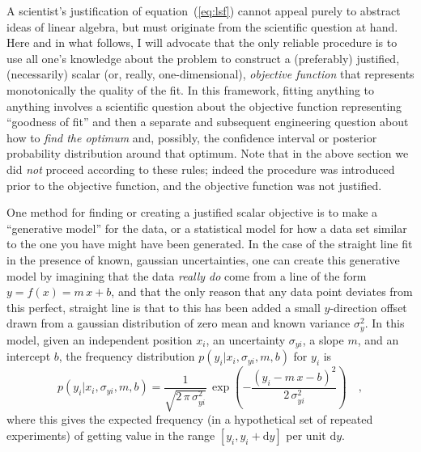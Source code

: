 \documentclass[12pt]{article}
\renewcommand{\d}{\mathrm{d}}
\begin{document}
A scientist's justification of equation~(\ref{eq:lsf}) cannot appeal
purely to abstract ideas of linear algebra, but must originate from
the scientific question at hand.  Here and in what follows, I will
advocate that the only reliable procedure is to use all one's
knowledge about the problem to construct a (preferably) justified,
(necessarily) scalar (or, really, one-dimensional), \emph{objective
function} that represents monotonically the quality of the fit.  In
this framework, fitting anything to anything involves a scientific
question about the objective function representing ``goodness of fit''
and then a separate and subsequent engineering question about how to
\emph{find the optimum} and, possibly, the confidence interval or
posterior probability distribution around that optimum.  Note that in
the above section we did \emph{not} proceed according to these rules;
indeed the procedure was introduced prior to the objective function,
and the objective function was not justified.

One method for finding or creating a justified scalar objective is to
make a ``generative model'' for the data, or a statistical model for
how a data set similar to the one you have might have been generated.
In the case of the straight line fit in the presence of known,
gaussian uncertainties, one can create this generative model by
imagining that the data \emph{really do} come from a line of the form
$y = f(x) = m\,x+b$, and that the only reason that any data point
deviates from this perfect, straight line is that to this has been
added a small $y$-direction offset drawn from a gaussian distribution
of zero mean and known variance $\sigma_y^2$.  In this model, given an
independent position $x_i$, an uncertainty $\sigma_{yi}$, a slope $m$,
and an intercept $b$, the frequency distribution
$p(y_i|x_i,\sigma_{yi},m,b)$ for $y_i$ is
\begin{equation}
p(y_i|x_i,\sigma_{yi},m,b) = \frac{1}{\sqrt{2\,\pi\,\sigma_{yi}^2}}
 \,\exp\left(-\frac{(y_i - m\,x - b)^2}{2\,\sigma_{yi}^2}\right) \quad ,
\end{equation}
where this gives the expected frequency (in a hypothetical set of
repeated experiments) of getting value in the range $[y_i,y_i+\d y]$
per unit $\d y$.
\end{document}
